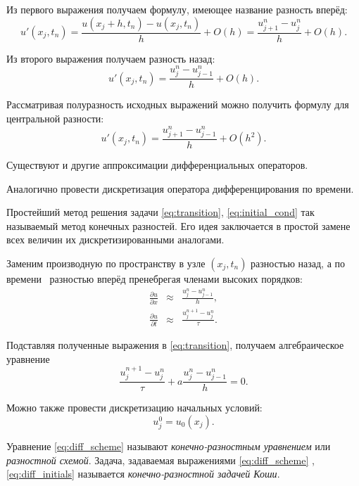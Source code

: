 Из первого выражения получаем формулу, имеющее название \guillemotleft{}разность
вперёд\guillemotright{}:
\[
u'(x_{j},t_{n})=\frac{u(x_{j}+h,t_{n})-u(x_{j},t_{n})}{h}+O(h)=\frac{u_{j+1}^{n}-u_{j}^{n}}{h}+O(h).
\]


Из второго выражения получаем \guillemotleft{}разность назад\guillemotright{}:
\[
u'(x_{j},t_{n})=\frac{u_{j}^{n}-u_{j-1}^{n}}{h}+O(h).
\]

Рассматривая полуразность исходных выражений можно получить формулу
для \guillemotleft{}центральной разности\guillemotright{}:
\[
u'(x_{j},t_{n})=\frac{u_{j+1}^{n}-u_{j-1}^{n}}{h}+O(h^{2}).
\]


Существуют и другие аппроксимации дифференциальных операторов.

Аналогично провести дискретизация оператора дифференцирования по времени.



Простейший метод решения задачи \eqref{eq:transition}, \eqref{eq:initial_cond}
\textemdash{} так называемый метод конечных разностей. Его идея заключается
в простой замене всех величин их дискретизированными аналогами.

Заменим производную по пространству в узле $(x_{j},t_{n})$ разностью
назад, а по времени \textemdash{}~разностью вперёд пренебрегая членами
высоких порядков:
\begin{eqnarray*}
\frac{\partial u}{\partial x} & \approx & \frac{u_{j}^{n}-u_{j-1}^{n}}{h},\\
\frac{\partial u}{\partial t} & \approx & \frac{u_{j}^{n+1}-u_{j}^{n}}{\tau}.
\end{eqnarray*}


Подставляя полученные выражения в \eqref{eq:transition}, получаем
алгебраическое уравнение
\begin{equation}
\frac{u_{j}^{n+1}-u_{j}^{n}}{\tau}+a\frac{u_{j}^{n}-u_{j-1}^{n}}{h}=0.\label{eq:diff_scheme}
\end{equation}


Можно также провести дискретизацию начальных условий:
\begin{equation}
u_{j}^{0}=u_{0}(x_{j}).\label{eq:diff_initials}
\end{equation}


Уравнение \eqref{eq:diff_scheme} называют \emph{конечно-разностным
уравнением} или \emph{разностной схемой}. Задача, задаваемая выражениями
\eqref{eq:diff_scheme} , \eqref{eq:diff_initials} называется \emph{конечно-разностной
задачей Коши}.

